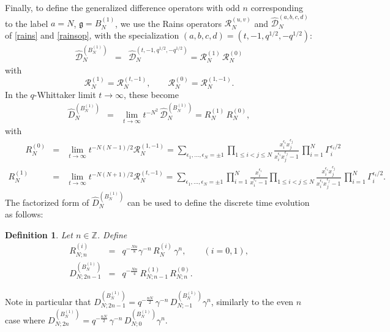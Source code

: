 \documentclass[12pt]{amsart}
\newtheorem{defn}[thm]{Definition}
\newcommand{\g}{{\mathfrak{g}}}
\newcommand{\Z}{{\mathbb Z}}
\numberwithin{equation}{section}
\begin{document}
Finally, to define the generalized difference operators with odd $n$ corresponding to the label $a=N$,  $\g=B_N^{(1)}$, we use
the Rains operators ${\mathcal R}_N^{(u,v)}$ and  $\widehat{\mathcal D}_N^{(a,b,c,d)}$of \eqref{rains} and \eqref{rainsop},   with the specialization $(a,b,c,d)=(t,-1,q^{1/2},-q^{1/2})$:
\begin{eqnarray*}
\widehat{\mathcal D}_N^{(B_N^{(1)})}&=&\widehat{\mathcal D}_N^{(t,-1,q^{1/2},-q^{1/2})}={\mathcal R}_N^{(1)}\, {\mathcal R}_N^{(0)} 
\end{eqnarray*}
with
$$
{\mathcal R}_N^{(1)}={\mathcal R}_N^{(t,-1)}, \qquad  {\mathcal R}_N^{(0)}={\mathcal R}_N^{(1,-1)} .
$$
In the $q$-Whittaker limit $t\to\infty$, these become 
\begin{eqnarray}
\widehat{D}_N^{(B_N^{(1)})}&=&\lim_{t\to \infty}t^{-N^2}\,   \widehat{\mathcal D}_N^{(B_N^{(1)})}= R_N^{(1)}\, R_N^{(0)} ,\label{rainsB}
\end{eqnarray}
with
\begin{eqnarray}\qquad R_N^{(0)}&=&\lim_{t\to\infty} t^{-N(N-1)/2} {\mathcal R}_N^{(1,-1)}=\sum_{\epsilon_1,...,\epsilon_N=\pm 1} 
\prod_{1\leq i<j\leq N}\frac{ x_i^{\epsilon_i}x_j^{\epsilon_j}}{x_i^{\epsilon_i}x_j^{\epsilon_j}-1}\, \prod_{i=1}^N \Gamma_i^{\epsilon_i/2}\label{rzero}\\
R_N^{(1)}&=&\lim_{t\to\infty} t^{-N(N+1)/2} {\mathcal R}_N^{(t,-1)}=\sum_{\epsilon_1,...,\epsilon_N=\pm 1} \prod_{i=1}^N \frac{x_i^{\epsilon_i}}{x_i^{\epsilon_i}-1}
\prod_{1\leq i<j\leq N}\frac{ x_i^{\epsilon_i}x_j^{\epsilon_j}}{x_i^{\epsilon_i}x_j^{\epsilon_j}-1}\, \prod_{i=1}^N \Gamma_i^{\epsilon_i/2}.\label{rone}
\end{eqnarray}
The factorized form of $\widehat{D}_N^{(B_N^{(1)})}$ can be used to define the discrete time evolution
as follows:
\begin{defn} Let $n\in \Z$. Define
\begin{eqnarray}
R_{N;n}^{(i)}&=& q^{-\frac{Nn}{8}} \gamma^{-n}\, R_N^{(i)} \, \gamma^{n},\qquad (i=0,1) , \nonumber\\
D^{(B_N^{(1)})}_{N;2n-1}&=& q^{-\frac{Nn}{4}} \, R_{N;n-1}^{(1)}\, R_{N;n}^{(0)}.\label{defDBNminusone}
\end{eqnarray}
\end{defn}
Note in particular that $D^{(B_N^{(1)})}_{N;2n-1}=q^{-\frac{n N}{2}}\, \gamma^{-n}\,D_{N;-1}^{(B_N^{(1)})}\gamma^{n}$, similarly to the even $n$ case
where $D^{(B_N^{(1)})}_{N;2n}=q^{-\frac{n N}{2}}\, \gamma^{-n}\,D_{N;0}^{(B_N^{(1)})}\gamma^{n}$. 
\end{document}
